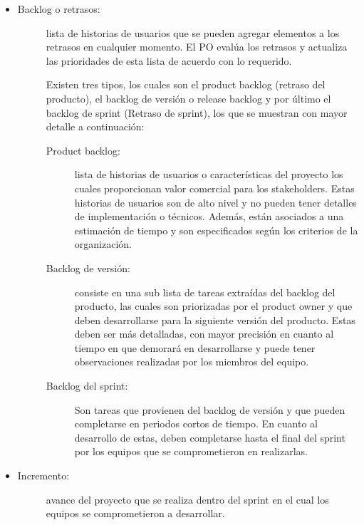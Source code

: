 \begin{itemize}
    \item   \begin{description}
                \item[Backlog o retrasos: ] lista de historias de usuarios que se pueden agregar elementos a los retrasos en cualquier momento. El PO evalúa los retrasos y actualiza las prioridades de esta lista de acuerdo con lo requerido.
                
                Existen tres tipos, los cuales son el product backlog (retraso del producto), el backlog de versión o release backlog y por último el backlog de sprint (Retraso de sprint), los que se muestran con mayor detalle a continuación:
                
                \begin{description}
                    \item[Product backlog: ] lista de historias de usuarios o características del proyecto los cuales proporcionan valor comercial para los stakeholders. Estas historias de usuarios son de alto nivel y no pueden tener detalles de implementación o técnicos. Además, están asociados a una estimación de tiempo y son especificados según los criterios de la organización.
                     
                    \item[Backlog de versión: ]  consiste en una sub lista de tareas extraídas del backlog del producto, las cuales son priorizadas por el product owner y que deben desarrollarse para la siguiente versión del producto. Estas deben ser más detalladas, con mayor precisión en cuanto al tiempo en que demorará en desarrollarse y puede tener observaciones realizadas por los miembros del equipo.
                     
                    \item[Backlog del sprint: ] Son tareas que provienen del backlog de versión y que pueden completarse en periodos cortos de tiempo. En cuanto al desarrollo de estas, deben completarse hasta el final del sprint por los equipos que se comprometieron en realizarlas.
                \end{description} 
            \end{description}    

    \item   \begin{description}
                \item[Incremento:] avance del proyecto que se realiza dentro del sprint en el cual los equipos se comprometieron a desarrollar.
            \end{description}
    

\end{itemize}
